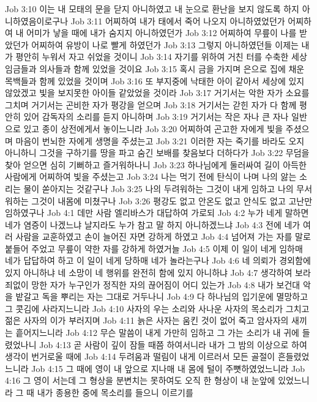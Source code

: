 Job 3:10  이는 내 모태의 문을 닫지 아니하였고 내 눈으로 환난을 보지 않도록 하지 아니하였음이로구나
Job 3:11  어찌하여 내가 태에서 죽어 나오지 아니하였었던가 어찌하여 내 어미가 낳을 때에 내가 숨지지 아니하였던가
Job 3:12  어찌하여 무릎이 나를 받았던가 어찌하여 유방이 나로 빨게 하였던가
Job 3:13  그렇지 아니하였던들 이제는 내가 평안히 누워서 자고 쉬었을 것이니
Job 3:14  자기를 위하여 거친 터를 수축한 세상 임금들과 의사들과 함께 있었을 것이요
Job 3:15  혹시 금을 가지며 은으로 집에 채운 목백들과 함께 있었을 것이며
Job 3:16  또 부지중에 낙태한 아이 같아서 세상에 있지 않았겠고 빛을 보지못한 아이들 같았었을 것이라
Job 3:17  거기서는 악한 자가 소요를 그치며 거기서는 곤비한 자가 평강을 얻으며
Job 3:18  거기서는 갇힌 자가 다 함께 평안히 있어 감독자의 소리를 듣지 아니하며
Job 3:19  거기서는 작은 자나 큰 자나 일반으로 있고 종이 상전에게서 놓이느니라
Job 3:20  어찌하여 곤고한 자에게 빛을 주셨으며 마음이 번뇌한 자에게 생명을 주셨는고
Job 3:21  이러한 자는 죽기를 바라도 오지 아니하니 그것을 구하기를 땅을 파고 숨긴 보배를 찾음보다 더하다가
Job 3:22  무덤을 찾아 얻으면 심히 기뻐하고 즐거워하나니
Job 3:23  하나님에게 둘러싸여 길이 아득한 사람에게 어찌하여 빛을 주셨는고
Job 3:24  나는 먹기 전에 탄식이 나며 나의 앓는 소리는 물이 쏟아지는 것같구나
Job 3:25  나의 두려워하는 그것이 내게 임하고 나의 무서워하는 그것이 내몸에 미쳤구나
Job 3:26  평강도 없고 안온도 없고 안식도 없고 고난만 임하였구나
Job 4:1  데만 사람 엘리바스가 대답하여 가로되
Job 4:2  누가 네게 말하면 네가 염증이 나겠느냐 날지라도 누가 참고 말 하지 아니하겠느냐
Job 4:3  전에 네가 여러 사람을 교훈하였고 손이 늘어진 자면 강하게 하였고
Job 4:4  넘어져 가는 자를 말로 붙들어 주었고 무릎이 약한 자를 강하게 하였거늘
Job 4:5  이제 이 일이 네게 임하매 네가 답답하여 하고 이 일이 네게 당하매 네가 놀라는구나
Job 4:6  네 의뢰가 경외함에 있지 아니하냐 네 소망이 네 행위를 완전히 함에 있지 아니하냐
Job 4:7  생각하여 보라 죄없이 망한 자가 누구인가 정직한 자의 끊어짐이 어디 있는가
Job 4:8  내가 보건대 악을 밭갈고 독을 뿌리는 자는 그대로 거두나니
Job 4:9  다 하나님의 입기운에 멸망하고 그 콧김에 사라지느니라
Job 4:10  사자의 우는 소리와 사나운 사자의 목소리가 그치고 젊은 사자의 이가 부러지며
Job 4:11  늙은 사자는 움킨 것이 없어 죽고 암사자의 새끼는 흩어지느니라
Job 4:12  무슨 말씀이 내게 가만히 임하고 그 가는 소리가 내 귀에 들렸었나니
Job 4:13  곧 사람이 깊이 잠들 때쯤 하여서니라 내가 그 밤의 이상으로 하여 생각이 번거로울 때에
Job 4:14  두려움과 떨림이 내게 이르러서 모든 골절이 흔들렸었느니라
Job 4:15  그 때에 영이 내 앞으로 지나매 내 몸에 털이 주뼛하였었느니라
Job 4:16  그 영이 서는데 그 형상을 분변치는 못하여도 오직 한 형상이 내 눈앞에 있었느니라 그 때 내가 종용한 중에 목소리를 들으니 이르기를
